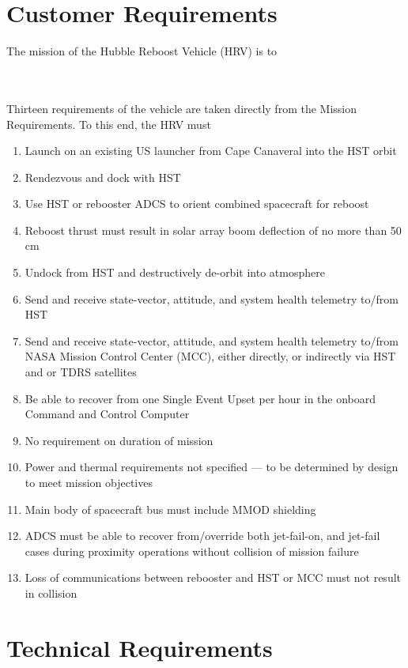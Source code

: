 \documentclass[onecolumn,10pt]{jhwhw}
\begin{document}
\section{Customer Requirements}

The mission of the Hubble Reboost Vehicle (HRV) is to

 \\
\\
Thirteen requirements of the vehicle are taken directly from the Mission Requirements. To this end, the HRV must
\begin{enumerate}
\item Launch on an existing US launcher from Cape Canaveral into the HST orbit
\item Rendezvous and dock with HST
\item Use HST or rebooster ADCS to orient combined spacecraft for reboost
\item Reboost thrust must result in solar array boom deflection of no more than 50 cm
\item Undock from HST and destructively de-orbit into atmosphere
\item Send and receive state-vector, attitude, and system health telemetry to/from HST
\item Send and receive state-vector, attitude, and system health telemetry to/from NASA Mission Control Center (MCC), either directly, or indirectly via HST and or TDRS satellites
\item Be able to recover from one Single Event Upset per hour in the onboard Command and Control Computer
\item No requirement on duration of mission
\item Power and thermal requirements not specified --- to be determined by design to meet mission objectives
\item Main body of spacecraft bus must include MMOD shielding
\item ADCS must be able to recover from/override both jet-fail-on, and jet-fail cases during proximity operations without collision of mission failure
\item Loss of communications between rebooster and HST or MCC must not result in collision
\end{enumerate}

\section{Technical Requirements}
\end{document}
